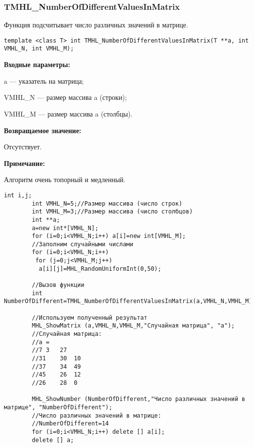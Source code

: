 \documentclass[a4paper,12pt]{article}
\begin{document}
\subsubsection{TMHL\_NumberOfDifferentValuesInMatrix}\label{TMHL_NumberOfDifferentValuesInMatrix}

Функция подсчитывает число различных значений в матрице.


\begin{lstlisting}[label=code_syntax_TMHL_NumberOfDifferentValuesInMatrix,caption=Синтаксис]
template <class T> int TMHL_NumberOfDifferentValuesInMatrix(T **a, int VMHL_N, int VMHL_M);
\end{lstlisting}

\textbf{Входные параметры:}  
 
a --- указатель на матрица;
 
VMHL\_N --- размер массива a (строки);
 
VMHL\_M --- размер массива a (столбцы).

\textbf{Возвращаемое значение:}

Отсутствует.

\textbf{Примечание:}

 Алгоритм очень топорный и медленный.


\begin{lstlisting}[label=code_use_TMHL_NumberOfDifferentValuesInMatrix,caption=Пример использования]
        int i,j;
        int VMHL_N=5;//Размер массива (число строк)
        int VMHL_M=3;//Размер массива (число столбцов)
        int **a;
        a=new int*[VMHL_N];
        for (i=0;i<VMHL_N;i++) a[i]=new int[VMHL_M];
        //Заполним случайными числами
        for (i=0;i<VMHL_N;i++)
         for (j=0;j<VMHL_M;j++)
          a[i][j]=MHL_RandomUniformInt(0,50);

        //Вызов функции
        int NumberOfDifferent=TMHL_NumberOfDifferentValuesInMatrix(a,VMHL_N,VMHL_M);

        //Используем полученный результат
        MHL_ShowMatrix (a,VMHL_N,VMHL_M,"Случайная матрица", "a");
        //Случайная матрица:
        //a =
        //7	3	27
        //31	30	10
        //37	34	49
        //45	26	12
        //26	28	0

        MHL_ShowNumber (NumberOfDifferent,"Число различных значений в матрице", "NumberOfDifferent");
        //Число различных значений в матрице:
        //NumberOfDifferent=14
        for (i=0;i<VMHL_N;i++) delete [] a[i];
        delete [] a;
\end{lstlisting}
\end{document}
